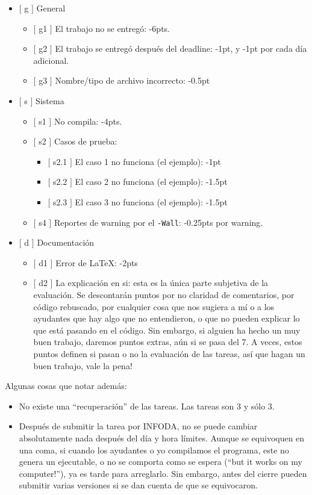 \documentclass[11pt]{article}
\begin{document}
\begin{itemize}
\item $[$ g $]$ General
  \begin{itemize}
  \item $[$ g1 $]$ El trabajo no se entreg\'o: -6pts.
  \item $[$ g2 $]$ El trabajo se entreg\'o despu\'es del deadline: -1pt, y
    -1pt por cada d\'ia adicional.
  \item $[$ g3 $]$ Nombre/tipo de archivo incorrecto: -0.5pt
  \end{itemize}
\item $[$ s $]$ Sistema
  \begin{itemize}
  \item $[$ s1 $]$ No compila: -4pts.
  \item $[$ s2 $]$ Casos de prueba:
    \begin{itemize}
    \item $[$ s2.1 $]$ El caso 1 no funciona (el ejemplo): -1pt
    \item $[$ s2.2 $]$ El caso 2 no funciona (el ejemplo): -1.5pt
    \item $[$ s2.3 $]$ El caso 3 no funciona (el ejemplo): -1.5pt
    \end{itemize}
  \item $[$ s4 $]$ Reportes de warning por el \verb+-Wall+: -0.25pts
    por warning.
  \end{itemize}
\item $[$ d $]$ Documentaci\'on
  \begin{itemize}
  \item $[$ d1 $]$ Error de \LaTeX: -2pts
  \item $[$ d2 $]$ La explicaci\'on en si: esta es la \'unica parte
    subjetiva de la evaluaci\'on. Se descontar\'an puntos por no claridad
    de comentarios, por c\'odigo rebuscado, por cualquier cosa que nos
    sugiera a m\'i o a los ayudantes que hay algo que no entendieron, o
    que no pueden explicar lo que est\'a pasando en el c\'odigo. Sin
    embargo, si alguien ha hecho un muy buen trabajo, daremos puntos
    extras, a\'un si se pasa del 7. A veces, estos puntos definen si
    pasan o no la evaluaci\'on de las tareas, as\'i que hagan un buen
    trabajo, vale la pena!
  \end{itemize}
\end{itemize}

Algunas cosas que notar adem\'as:

\begin{itemize}
\item No existe una ``recuperaci\'on'' de las tareas. Las tareas son 3 y
  s\'olo 3.
\item Despu\'es de submitir la tarea por INFODA, no se puede cambiar
  absolutamente nada despu\'es del d\'ia y hora l\'imites. Aunque se
  equivoquen en una coma, si cuando los ayudantes o yo compilamos el
  programa, este no genera un ejecutable, o no se comporta como se
  espera (``but it works on my computer!''), ya es tarde para
  arreglarlo. Sin embargo, antes del cierre pueden submitir varias
  versiones si se dan cuenta de que se equivocaron.
\end{itemize}
\end{document}
